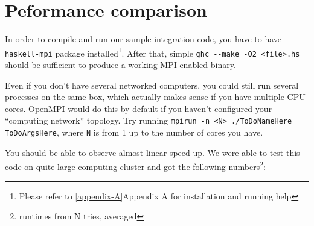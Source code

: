 \documentclass{tmr}
\begin{document}
%
%
%

\section{Peformance comparison}

In order to compile and run our sample integration code, you have to
have \verb|haskell-mpi| package installed\footnote{Please refer to
  \ref{appendix-A}{Appendix A} for installation and running help}. After that,
simple \verb|ghc --make -O2 <file>.hs| should be sufficient to produce
a working MPI-enabled binary.

Even if you don't have several networked computers, you could still
run several processes on the same box, which actually makes sense if
you have multiple CPU cores. OpenMPI would do this by default if you
haven't configured your ``computing network'' topology. Try running
\verb|mpirun -n <N> ./ToDoNameHere ToDoArgsHere|, where \verb|N| is
from 1 up to the number of cores you have.

You should be able to observe almost linear speed up. We were able to
test this code on quite large computing cluster and got the following
numbers\footnote{runtimes from N tries, averaged}:
\end{document}
